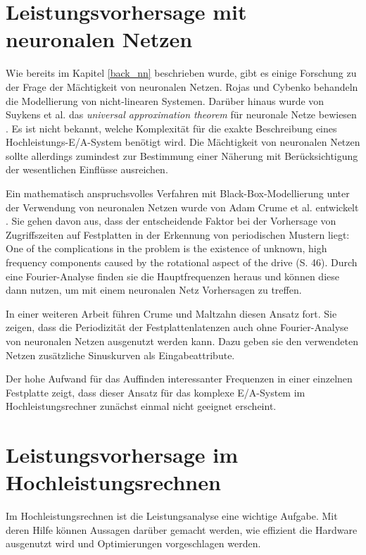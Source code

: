 \documentclass[
	12pt,
	a4paper,
	BCOR10mm,
	DIV14,
	listof=totoc,
	bibliography=totoc,
	headsepline
]{scrreprt}
\begin{document}
\section{Leistungsvorhersage mit neuronalen Netzen}
\label{rel_vorhersage-mit-nn}
Wie bereits im Kapitel \ref{back_nn} beschrieben wurde, gibt es einige Forschung zu der Frage der Mächtigkeit von neuronalen Netzen. Rojas \cite{Rojas:1996:NNS:235222} und  Cybenko \cite{cybenko:mcss} behandeln die Modellierung von nicht-linearen Systemen. Darüber hinaus wurde von Suykens et al. das \textit{universal approximation theorem} für neuronale Netze bewiesen \cite{suykens2012artificial}. Es ist nicht bekannt, welche Komplexität für die exakte Beschreibung eines Hochleistungs-E/A-System benötigt wird. Die Mächtigkeit von neuronalen Netzen sollte allerdings zumindest zur Bestimmung einer Näherung mit Berücksichtigung der wesentlichen Einflüsse ausreichen.

Ein mathematisch anspruchsvolles Verfahren mit Black-Box-Modellierung unter der Verwendung von neuronalen Netzen wurde von Adam Crume et al. entwickelt \cite{Crume:2013:FML:2538542.2538561}. Sie gehen davon aus, dass der entscheidende Faktor bei der Vorhersage von Zugriffszeiten auf Festplatten in der Erkennung von periodischen Mustern liegt: \glqq One of the complications in the problem is the existence of unknown, high frequency components caused by the rotational aspect of the drive\grqq{} \cite{Crume:2013:FML:2538542.2538561} (S. 46).
Durch eine Fourier-Analyse finden sie die Hauptfrequenzen heraus und können diese dann nutzen, um mit einem neuronalen Netz Vorhersagen zu treffen.

In einer weiteren Arbeit führen Crume und Maltzahn diesen Ansatz fort. Sie zeigen, dass die Periodizität der Festplattenlatenzen auch ohne Fourier-Analyse von neuronalen Netzen ausgenutzt werden kann. Dazu geben sie den verwendeten Netzen zusätzliche Sinuskurven als Eingabeattribute. \cite{adamcrumecarlosmaltzahn2015}

Der hohe Aufwand für das Auffinden interessanter Frequenzen in einer einzelnen Festplatte zeigt, dass dieser Ansatz für das komplexe E/A-System im Hochleistungsrechner zunächst einmal nicht geeignet erscheint.

\section{Leistungsvorhersage im Hochleistungsrechnen}
\label{rel_vorhersage_im-hpc}
Im Hochleistungsrechnen ist die Leistungsanalyse eine wichtige Aufgabe. Mit deren Hilfe können Aussagen darüber gemacht werden, wie effizient die Hardware ausgenutzt wird und Optimierungen vorgeschlagen werden. 
\end{document}
